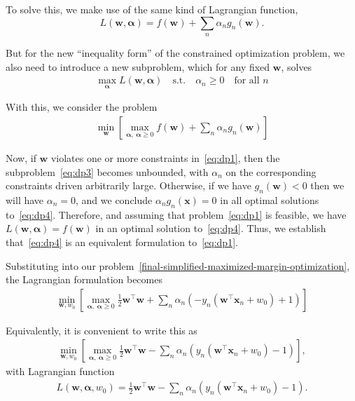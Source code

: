 To solve this,  we make use of the same kind of Lagrangian function,
%
\begin{equation}
  \label{eq:dp2}
  L({\mathbf w},\boldsymbol{\alpha})=f({\mathbf w})+\sum_n \alpha_n g_n({\mathbf w}).
\end{equation}

But for the new ``inequality form'' of the constrained optimization problem,
we also need to introduce a new subproblem, which for any fixed ${\mathbf w}$, solves
%
\begin{align}
  \label{eq:dp3}
  \max_{\boldsymbol{\alpha}} L({\mathbf w},\boldsymbol{\alpha}) \quad   \mbox{s.t.} \quad  \alpha_n \geq 0\quad\mbox{for all $n$}
\end{align}

With this, we consider the problem
%
%
\begin{align}
\label{eq:dp4}
 \min_{\mathbf w} \left[\max_{\boldsymbol{\alpha}, \ \boldsymbol{\alpha}\geq 0} f({\mathbf w})+\sum_n \alpha_n g_n({\mathbf w})\right]
\end{align}

Now, if ${\mathbf w}$ violates one or more constraints in~\eqref{eq:dp1}, then the subproblem~\eqref{eq:dp3} becomes unbounded, with $\alpha_n$ on the corresponding constraints driven arbitrarily large. Otherwise, if we have $g_n({\mathbf w})<0$ then we will have $\alpha_n=0$, and
we conclude $\alpha_n g_n({\mathbf x})=0$ in all optimal solutions to~\eqref{eq:dp4}.
Therefore, and assuming that problem~\eqref{eq:dp1} is feasible, we have $L({\mathbf w},\boldsymbol{\alpha})=f({\mathbf w})$ in an optimal solution to~\eqref{eq:dp4}.
%
Thus, we establish that~\eqref{eq:dp4}  is an equivalent formulation  to~\eqref{eq:dp1}.

\medskip

Substituting into our problem~\eqref{final-simplified-maximized-margin-optimization}, the Lagrangian formulation becomes
%
\begin{align}
  \min_{\mathbf{w},w_0}\left[\max_{\boldsymbol{\alpha},\ \boldsymbol{\alpha}\geq 0} \frac{1}{2} {\mathbf w}^\top{\mathbf w} +\sum_n \alpha_n(-y_{n}(\textbf{w}^\top\textbf{x}_{n} + w_{0}) + 1)\right]
\end{align}

Equivalently, it is convenient to write this as
\begin{align}
  \min_{\mathbf{w},w_0}\left[\max_{\boldsymbol{\alpha},\ \boldsymbol{\alpha}\geq 0} \frac{1}{2} {\mathbf w}^\top{\mathbf w} -\sum_n \alpha_n(y_{n}(\textbf{w}^\top\textbf{x}_{n} + w_{0}) - 1)\right],
\end{align}
%
with Lagrangian function
%
\begin{align}
  L({\mathbf w},\boldsymbol{\alpha},w_0)=\frac{1}{2} {\mathbf w}^\top{\mathbf w} -\sum_n \alpha_n(y_{n}(\textbf{w}^\top\textbf{x}_{n} + w_{0}) - 1).
  \end{align}



